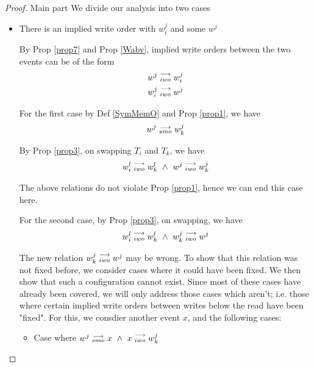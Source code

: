\begin{proof}{Main part}
                We divide our analysis into two cases 
                \begin{itemize}
                    \item There is an implied write order with $w_i^j$ and some $w^j$

                        By Prop \ref{prop7} and Prop \ref{Wabv}, implied write orders between the two events can be of the form 
                        \begin{align*}
                            w^j\stackrel{\longrightarrow}{_{iwo}}w_i^j \\
                            w_i^j\stackrel{\longrightarrow}{_{iwo}}w^j 
                        \end{align*}

                        For the first case by Def \ref{SymMemO} and Prop \ref{prop1}, we have
                        \begin{align*}
                            w^j\stackrel{\longrightarrow}{_{smo}}w_k^j
                        \end{align*}

                        By Prop \ref{prop3}, on swapping $T_i$ and $T_k$, we have 
                        \begin{align*}
                            \reln{w_i^l}{iwo}{w_k^l} \ \wedge \ \reln{w^j}{iwo}{w_k^j}
                        \end{align*}

                        The above relations do not violate Prop \ref{prop1}, hence we can end this case here. 

                        For the second case, by Prop \ref{prop3}, on swapping, we have 
                        \begin{align*}
                            \reln{w_i^l}{iwo}{w_k^l} \ \wedge \ \reln{w_k^j}{iwo}{w^j}
                        \end{align*}

                        The new relation $w_k^j\stackrel{\longrightarrow}{_{iwo}}w^j$ may be wrong. 
                        To show that this relation was not fixed before, we consider cases where it could have been fixed. We then show that such a configuration cannot exist. Since most of these cases have already been covered, we will only address those cases which aren't; i.e. those where certain implied write orders between writes below the read have been "fixed". For this, we consdier another event $x$, and the following cases:

                        \begin{itemize}
                            \item Case where $w^j\stackrel{\longrightarrow}{_{smo}}x \ \wedge \ x\stackrel{\longrightarrow}{_{iwo}}w_k^j$


\end{itemize}
\end{itemize}
\end{proof}
